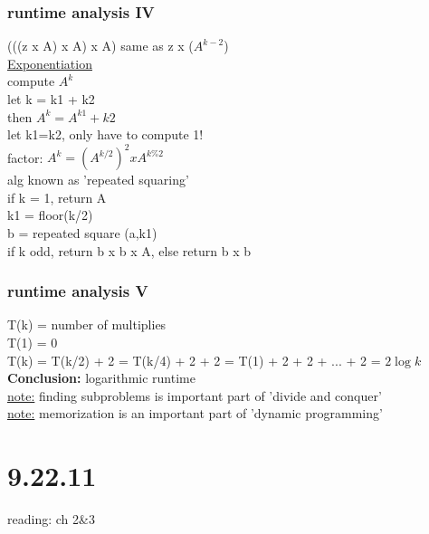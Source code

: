 \documentclass[a4paper]{article}
\begin{document}
      \subsubsection{runtime analysis IV}
        (((z x A) x A) x A) same as z x ($A^{k-2}$)\\
        \underline{Exponentiation}\\
        compute $A^{k}$\\
        let k = k1 + k2\\
        then $A^{k} = A^{k1} + {k2}$\\
        let k1=k2, only have to compute 1!\\
        factor: $A^{k} = (A^{k/2})^{2} x A^{k \% 2}$\\
        alg known as 'repeated squaring'\\
        if k = 1, return A\\
        k1 = floor(k/2)\\
        b = repeated square (a,k1)\\
        if k odd, return b x b x A, else return b x b
      \subsubsection{runtime analysis V}
        T(k) = number of multiplies\\
        T(1) = 0\\
        T(k) = T(k/2) + 2 = T(k/4) + 2 + 2 = T(1) + 2 + 2 + ... + 2 = $2\log{k}$
        \textbf{Conclusion:} logarithmic runtime\\
        \underline{note:} finding subproblems is important part of 'divide and conquer'\\
        \underline{note:} memorization is an important part of 'dynamic programming'
  \section{9.22.11}
    reading: ch 2\&3
\end{document}

